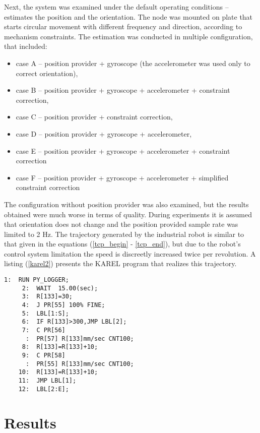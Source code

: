  Next, the system was examined under the default operating conditions -- estimates the position and the orientation. The node was mounted on plate that starts circular movement with different frequency and direction, according to mechanism constraints. The estimation was conducted in multiple configuration, that included:
\begin{itemize}
	\item case A -- position provider + gyroscope (the accelerometer was used only to correct orientation),
	\item case B -- position provider + gyroscope + accelerometer + constraint correction,
	\item case C -- position provider + constraint correction,
	\item case D -- position provider + gyroscope + accelerometer,
	\item case E -- position provider + gyroscope + accelerometer + constraint correction
	\item case F -- position provider + gyroscope + accelerometer + simplified constraint correction
\end{itemize}

The configuration without position provider was also examined, but the results obtained were much worse in terms of quality. During experiments it is assumed that orientation does not change and the position provided sample rate was limited to 2 Hz. The trajectory generated by the industrial robot is similar to that given in the equations (\ref{tcp_begin} - \ref{tcp_end}), but due to the robot's control system limitation the speed is discreetly increased twice per revolution. A listing (\ref{karel2}) presents the KAREL program that realizes this trajectory.

\begin{lstlisting}[caption={The KAREL program realizing a circular motion}, captionpos=t, label=karel2]
 	 1:  RUN PY_LOGGER;
	 2:  WAIT  15.00(sec);
	 3:  R[133]=30;
 	 4:  J PR[55] 100% FINE;
	 5:  LBL[1:S];
	 6:  IF R[133]>300,JMP LBL[2];
 	 7:  C PR[56]    
	  :  PR[57] R[133]mm/sec CNT100;
	 8:  R[133]=R[133]+10;
	 9:  C PR[58]    
	  :  PR[55] R[133]mm/sec CNT100;
	10:  R[133]=R[133]+10;
	11:  JMP LBL[1];
	12:  LBL[2:E];
\end{lstlisting}

\section{Results}

